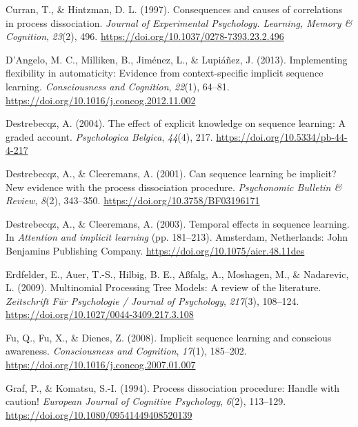 \documentclass[english,,man]{apa6}
\begin{document}
\leavevmode\hypertarget{ref-curran_consequences_1997}{}%
Curran, T., \& Hintzman, D. L. (1997). Consequences and causes of correlations in process dissociation. \emph{Journal of Experimental Psychology. Learning, Memory \& Cognition}, \emph{23}(2), 496. \url{https://doi.org/10.1037/0278-7393.23.2.496}

\leavevmode\hypertarget{ref-dangelo_implementing_2013}{}%
D'Angelo, M. C., Milliken, B., Jiménez, L., \& Lupiáñez, J. (2013). Implementing flexibility in automaticity: Evidence from context-specific implicit sequence learning. \emph{Consciousness and Cognition}, \emph{22}(1), 64--81. \url{https://doi.org/10.1016/j.concog.2012.11.002}

\leavevmode\hypertarget{ref-destrebecqz_effect_2004}{}%
Destrebecqz, A. (2004). The effect of explicit knowledge on sequence learning: A graded account. \emph{Psychologica Belgica}, \emph{44}(4), 217. \url{https://doi.org/10.5334/pb-44-4-217}

\leavevmode\hypertarget{ref-destrebecqz_can_2001}{}%
Destrebecqz, A., \& Cleeremans, A. (2001). Can sequence learning be implicit? New evidence with the process dissociation procedure. \emph{Psychonomic Bulletin \& Review}, \emph{8}(2), 343--350. \url{https://doi.org/10.3758/BF03196171}

\leavevmode\hypertarget{ref-destrebecqz_temporal_2003_doi}{}%
Destrebecqz, A., \& Cleeremans, A. (2003). Temporal effects in sequence learning. In \emph{Attention and implicit learning} (pp. 181--213). Amsterdam, Netherlands: John Benjamins Publishing Company. \url{https://doi.org/10.1075/aicr.48.11des}

\leavevmode\hypertarget{ref-erdfelder_multinomial_2009}{}%
Erdfelder, E., Auer, T.-S., Hilbig, B. E., Aßfalg, A., Moshagen, M., \& Nadarevic, L. (2009). Multinomial Processing Tree Models: A review of the literature. \emph{Zeitschrift Für Psychologie / Journal of Psychology}, \emph{217}(3), 108--124. \url{https://doi.org/10.1027/0044-3409.217.3.108}

\leavevmode\hypertarget{ref-fu_implicit_2008}{}%
Fu, Q., Fu, X., \& Dienes, Z. (2008). Implicit sequence learning and conscious awareness. \emph{Consciousness and Cognition}, \emph{17}(1), 185--202. \url{https://doi.org/10.1016/j.concog.2007.01.007}

\leavevmode\hypertarget{ref-graf_process_1994}{}%
Graf, P., \& Komatsu, S.-I. (1994). Process dissociation procedure: Handle with caution! \emph{European Journal of Cognitive Psychology}, \emph{6}(2), 113--129. \url{https://doi.org/10.1080/09541449408520139}
\end{document}
